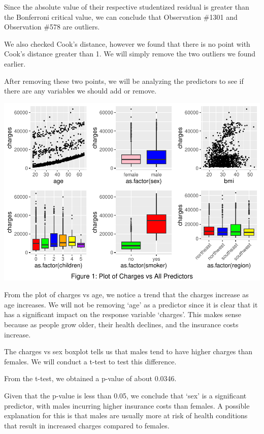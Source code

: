 \documentclass[
  12pt,
]{article}
\begin{document}
Since the absolute value of their respective studentized residual is
greater than the Bonferroni critical value, we can conclude that
Observation \#1301 and Observation \#578 are outliers.

We also checked Cook's distance, however we found that there is no point
with Cook's distance greater than 1. We will simply remove the two
outliers we found earlier.

\newpage

After removing these two points, we will be analyzing the predictors to
see if there are any variables we should add or remove.

\includegraphics{finalproject_files/figure-latex/unnamed-chunk-7-1.pdf}

From the plot of charges vs age, we notice a trend that the charges
increase as age increases. We will not be removing `age' as a predictor
since it is clear that it has a significant impact on the response
variable `charges'. This makes sense because as people grow older, their
health declines, and the insurance costs increase.

The charges vs sex boxplot tells us that males tend to have higher
charges than females. We will conduct a t-test to test this difference.

From the t-test, we obtained a p-value of about 0.0346.

Given that the p-value is less than 0.05, we conclude that `sex' is a
significant predictor, with males incurring higher insurance costs than
females. A possible explanation for this is that males are usually more
at risk of health conditions that result in increased charges compared
to females.
\end{document}
